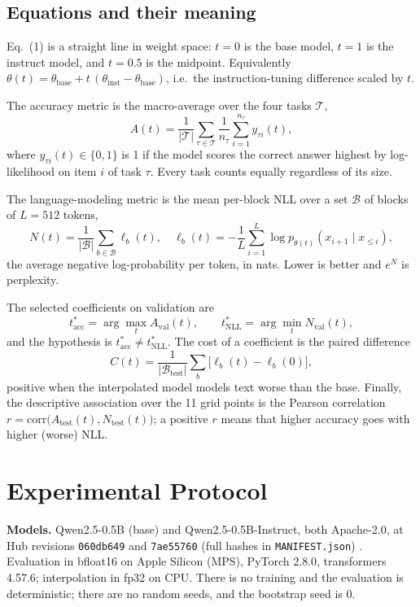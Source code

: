 \documentclass[conference]{IEEEtran}
\begin{document}
\subsection*{Equations and their meaning}
Eq.~(1) is a straight line in weight space: $t=0$ is the base model, $t=1$ is the instruct model, and $t=0.5$ is the midpoint. Equivalently $\theta(t)=\theta_{\text{base}}+t\,(\theta_{\text{inst}}-\theta_{\text{base}})$, i.e.\ the instruction-tuning difference scaled by $t$.

The accuracy metric is the macro-average over the four tasks $\mathcal{T}$,
\begin{equation}
A(t)=\frac{1}{|\mathcal{T}|}\sum_{\tau\in\mathcal{T}}\frac{1}{n_\tau}\sum_{i=1}^{n_\tau} y_{\tau i}(t),
\end{equation}
where $y_{\tau i}(t)\in\{0,1\}$ is 1 if the model scores the correct answer highest by log-likelihood on item $i$ of task $\tau$. Every task counts equally regardless of its size.

The language-modeling metric is the mean per-block NLL over a set $\mathcal{B}$ of blocks of $L=512$ tokens,
\begin{equation}
N(t)=\frac{1}{|\mathcal{B}|}\sum_{b\in\mathcal{B}}\ell_b(t),\quad \ell_b(t)=-\frac{1}{L}\sum_{i=1}^{L}\log p_{\theta(t)}(x_{i+1}\mid x_{\le i}),
\end{equation}
the average negative log-probability per token, in nats. Lower is better and $e^{N}$ is perplexity.

The selected coefficients on validation are
\begin{equation}
t^\ast_{\mathrm{acc}}=\arg\max_t A_{\mathrm{val}}(t),\qquad t^\ast_{\mathrm{NLL}}=\arg\min_t N_{\mathrm{val}}(t),
\end{equation}
and the hypothesis is $t^\ast_{\mathrm{acc}}\neq t^\ast_{\mathrm{NLL}}$. The cost of a coefficient is the paired difference
\begin{equation}
C(t)=\frac{1}{|\mathcal{B}_{\mathrm{test}}|}\sum_{b}\big[\ell_b(t)-\ell_b(0)\big],
\end{equation}
positive when the interpolated model models text worse than the base. Finally, the descriptive association over the 11 grid points is the Pearson correlation $r=\mathrm{corr}\big(A_{\mathrm{test}}(t),N_{\mathrm{test}}(t)\big)$; a positive $r$ means that higher accuracy goes with higher (worse) NLL.

\section{Experimental Protocol}
\textbf{Models.} Qwen2.5-0.5B (base) and Qwen2.5-0.5B-Instruct, both Apache-2.0, at Hub revisions \texttt{060db649} and \texttt{7ae55760} (full hashes in \texttt{MANIFEST.json}) \cite{qwen25}. Evaluation in bfloat16 on Apple Silicon (MPS), PyTorch 2.8.0, transformers 4.57.6; interpolation in fp32 on CPU. There is no training and the evaluation is deterministic; there are no random seeds, and the bootstrap seed is 0.
\end{document}
